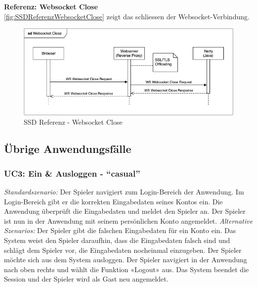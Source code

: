 \documentclass[11pt,ngerman]{article}
\newcommand{\quotes}[1]{``#1''}
\begin{document}
    \noindent \textbf{Referenz: \Gls{Websocket} Close} \\
    \autoref{fig:SSDReferenzWebsocketClose} zeigt das schliessen der \Gls{Websocket}-Verbindung.
    \begin{figure}[H]
    	\centering
    	\includegraphics[scale=0.6]{figures/SSD-Websocket_Close.png}
    	\caption{SSD Referenz - \Gls{Websocket} Close}
    	\label{fig:SSDReferenzWebsocketClose}
    \end{figure}

    \subsection{Übrige Anwendungsfälle}
    \subsubsection{UC3: Ein \& Ausloggen  - \quotes{casual}}
    \label{sssec:UC3EinAusloggen}
    \begin{tcolorbox}[enhanced, breakable, sharp corners, width=\dimexpr\textwidth-15mm\relax ,enlarge left by=10mm ,fontupper=\linespread{1.1}\selectfont, boxrule=1pt, title={UC3: Ein \& Ausloggen }, colback=white, colframe=gray!22, coltitle=black]
    	\textit{Standardszenario:} Der Spieler navigiert zum Login-Bereich der Anwendung. Im Login-Bereich gibt er die korrekten Eingabedaten seines Kontos ein. Die Anwendung überprüft die Eingabedaten und meldet den Spieler an. Der
    	Spieler ist nun in der Anwendung mit seinem persönlichen Konto angemeldet.\newline
    	\newline
    	\textit{Alternative Szenarios:} \newline
    	Der Spieler gibt die falschen Eingabedaten für ein Konto ein. Das System weist den Spieler
    	daraufhin, dass die Eingabedaten falsch sind und schlägt dem Spieler vor, die Eingabedaten nocheinmal einzugeben. \newline
    	\newline
    	Der Spieler möchte sich aus dem System ausloggen. Der Spieler navigiert in der Anwendung nach oben rechts und wählt die Funktion «Logout» aus. Das System beendet die Session und der Spieler wird als Gast neu angemeldet.
    \end{tcolorbox}
\end{document}
